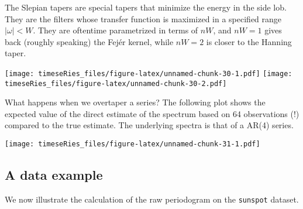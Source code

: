 \documentclass[]{book}
\begin{document}
The Slepian tapers are special tapers that minimize the energy in the
side lob. They are the filters whose transfer function is maximized in a
specified range \(|\omega|< W\). They are oftentime parametrized in
terms of \(nW\), and \(nW=1\) gives back (roughly speaking) the Fejér
kernel, while \(nW=2\) is closer to the Hanning taper.

\texttt{[image: timeseRies\_files/figure-latex/unnamed-chunk-30-1.pdf]}
\texttt{[image: timeseRies\_files/figure-latex/unnamed-chunk-30-2.pdf]}

What happens when we overtaper a series? The following plot shows the
expected value of the direct estimate of the spectrum based on 64
observations (!) compared to the true estimate. The underlying spectra
is that of a AR(4) series.

\texttt{[image: timeseRies\_files/figure-latex/unnamed-chunk-31-1.pdf]}

\subsection{A data example}\label{a-data-example}

We now illustrate the calculation of the raw periodogram on the
\texttt{sunspot} dataset.
\end{document}
